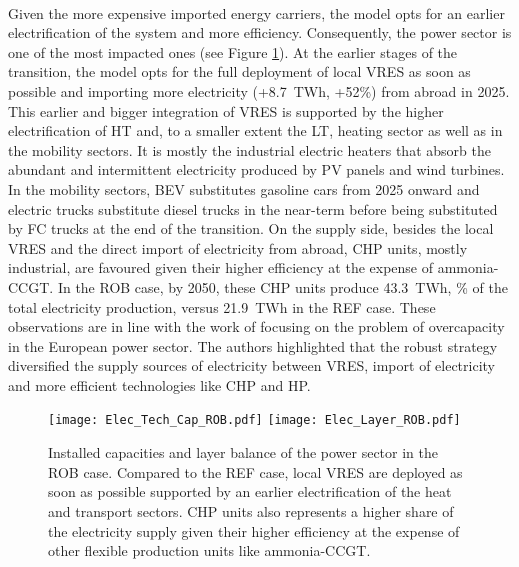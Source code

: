 \\

Given the more expensive imported energy carriers, the model opts for an earlier electrification of the system and more efficiency. Consequently, the power sector is one of the most impacted ones (see Figure \ref{fig:rob_pol_ROB_elec}). At the earlier stages of the transition,  the model opts for the full deployment of local \gls{VRES} as soon as possible and importing more electricity (\ie +8.7~TWh, +52\%) from abroad in 2025.  This earlier and bigger integration of \gls{VRES} is supported by the higher electrification of \gls{HT} and, to a smaller extent the \gls{LT}, heating sector as well as in the mobility sectors. It is mostly the industrial electric heaters that absorb the abundant and intermittent electricity produced by \gls{PV} panels and wind turbines. In the mobility sectors, \gls{BEV} substitutes gasoline cars from 2025 onward and electric trucks substitute diesel trucks in the near-term before being substituted by \gls{FC} trucks at the end of the transition.  On the supply side, besides the local \gls{VRES} and the direct import of electricity from abroad, \gls{CHP} units, mostly industrial, are favoured given their higher efficiency at the expense of ammonia-\gls{CCGT}. In the ROB case, by 2050, these \gls{CHP} units produce 43.3~TWh, \% of the total electricity production, versus 21.9~TWh in the REF case. These observations are in line with the work of  \citet{moret2020overcapacity} focusing on the problem of overcapacity in the European power sector. The authors highlighted that the robust strategy diversified the supply sources of electricity between \gls{VRES}, import of electricity and more efficient technologies like \gls{CHP} and \gls{HP}.

\begin{figure}[htbp!]
\centering
\texttt{[image: Elec\_Tech\_Cap\_ROB.pdf]}
\texttt{[image: Elec\_Layer\_ROB.pdf]}
\caption{Installed capacities and layer balance of the power sector in the ROB case. Compared to the REF case, local \gls{VRES} are deployed as soon as possible supported by an earlier electrification of the heat and transport sectors. \gls{CHP} units also represents a higher share of the electricity supply given their higher efficiency at the expense of other flexible production units like ammonia-\gls{CCGT}.}
\label{fig:rob_pol_ROB_elec}
\end{figure}

\\

